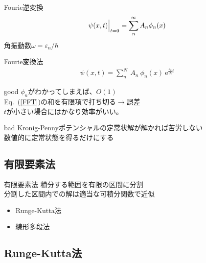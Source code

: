 \documentclass[unicode, 12pt, aspectratio=169]{beamer}
\newcommand{\eref}[1]{Eq.~(\ref{#1})}
\begin{document}
\begin{frame}
    Fourie逆変換
    \begin{align}
      \Bigl.\psi(x, t)\Bigr|_{t=0} = \sum_{n}^{\infty} A_{n} \phi_n(x)\label{FFT1}
    \end{align}
    角振動数$\omega = \varepsilon_n / \hbar$
    \begin{block}{Fourie変換法}
    \begin{align}
      \psi(x,t)=\sum_{n}^{N}\:A_n\ \phi_n(x) \:\mathrm{e}^{\frac{\varepsilon_n}{i\hbar} t}\label{FFT}
    \end{align}
    \end{block}
\end{frame}

\begin{frame}
  \begin{block}{good}
    $\phi_n$がわかってしまえば、$O(1)$\\
    \eref{FFT}の和を有限項で打ち切る$\rightarrow$誤差\\
    $t$が小さい場合にはかなり効率がいい。
  \end{block}
  \begin{block}{bad}
    Kronig-Pennyポテンシャルの定常状解が解かれば苦労しない\\
    数値的に定常状態を得るだけにする
  \end{block}
\end{frame}

\subsection{有限要素法}
\frame{\insertsubsection}
\begin{frame}
  \begin{block}{有限要素法}
    積分する範囲を有限の区間に分割\\
    分割した区間内での解は適当な可積分関数で近似
  \end{block}
  \begin{itemize}
    \item Runge-Kutta法
    \item 線形多段法
  \end{itemize}
\end{frame}

\subsection{Runge-Kutta法}
\frame{\insertsubsection}
\end{document}
